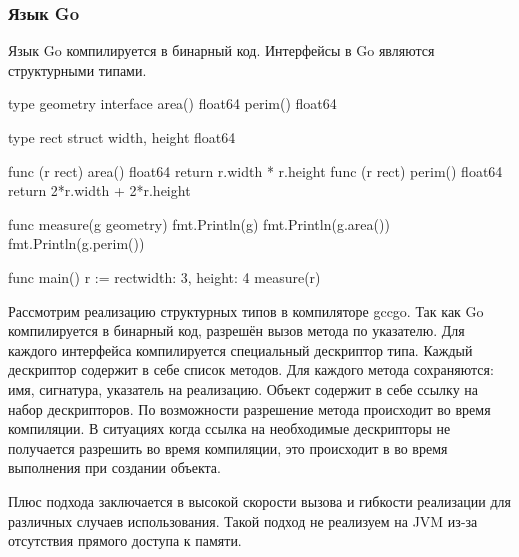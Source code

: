 \subsubsection{Язык Go}
Язык Go компилируется в бинарный код. Интерфейсы в Go являются структурными типами\cite{go}.

\begin{pyglist}[language=go]
type geometry interface {
    area() float64
    perim() float64
}

type rect struct {
    width, height float64
}

func (r rect) area() float64 {
    return r.width * r.height
}
func (r rect) perim() float64 {
    return 2*r.width + 2*r.height
}

func measure(g geometry) {
    fmt.Println(g)
    fmt.Println(g.area())
    fmt.Println(g.perim())
}

func main() {
    r := rect{width: 3, height: 4}
    measure(r)
}
\end{pyglist}

Рассмотрим реализацию структурных типов в компиляторе gccgo. Так как Go компилируется в бинарный код, разрешён вызов метода по указателю. Для каждого интерфейса компилируется специальный дескриптор типа. Каждый дескриптор содержит в себе список методов. Для каждого метода сохраняются: имя, сигнатура, указатель на реализацию. Объект содержит в себе ссылку на набор дескрипторов. По возможности разрешение метода происходит во время компиляции. В ситуациях когда ссылка на необходимые дескрипторы не получается разрешить во время компиляции, это происходит в во время выполнения при создании объекта.

Плюс подхода заключается в высокой скорости вызова и гибкости реализации для различных случаев использования. Такой подход не реализуем на JVM из-за отсутствия прямого доступа к памяти.
